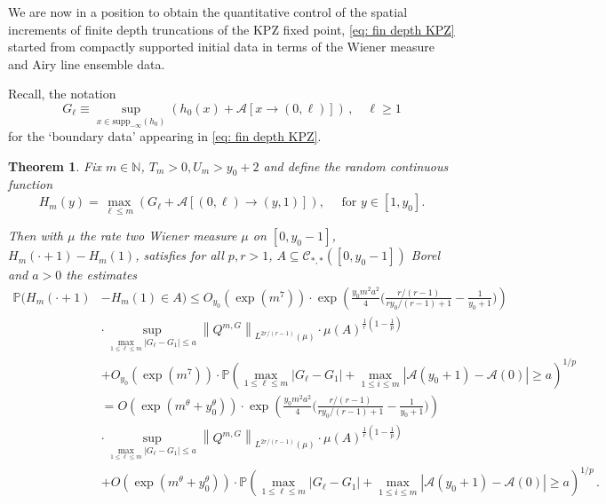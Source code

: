 \documentclass[11pt, reqno]{amsart}
\numberwithin{equation}{section}
\newcounter{dummy} \numberwithin{dummy}{section}
\newtheorem{theorem}[dummy]{Theorem}
\newcommand{\N}{\ensuremath{\mathbb{N}}}
\newcommand{\PP}{\ensuremath{\mathbb{P}}}
\newcommand{\norm}[1]{\left\lVert#1\right\rVert}
\begin{document}
We are now in a position to obtain the quantitative control of the spatial increments of finite depth truncations of the KPZ fixed point, \eqref{eq: fin depth KPZ} started from compactly supported initial data in terms of the Wiener measure and Airy line ensemble data.

Recall, the notation
\begin{equation*}
    G_\ell \equiv \sup_{ x\in \mathrm{supp}_{-\infty}(h_0)}(h_0(x)+\mathcal{A}[x\to(0,\ell)])\,,\quad \ell \ge 1
    \end{equation*}
    for the `boundary data' appearing in \eqref{eq: fin depth KPZ}.
\begin{theorem}\label{thm: finite depth KPZ estimates a priori}
 Fix $m\in \N$, $T_m>0 , U_m>y_0+2$ and define the random continuous function
\begin{equation*}
    H_m(y) = \displaystyle\max_{\ell \le m}(G_\ell + \mathcal{A}[(0,\ell)\to (y,1)]), \quad \text{ for } y\in [1,y_0].
\end{equation*}

Then with $\mu$ the rate two Wiener measure $\mu$ on $[0,y_0-1]$, $H_m(\cdot+1)-H_m(1)$, satisfies for all $p, r> 1$, $A\subseteq \mathscr{C}_{*, *}([0,y_0-1])$ Borel and $a> 0$ the estimates
\begin{align*}
    \PP ( H_m(\cdot + 1)&-H_m(1)\in A ) \le O_{y_0}(\exp(m^7))\cdot\exp\left({\frac{y_0m^2 a^2}{4}\big(\frac{r/(r-1)}{ry_0/(r-1)+1}-\frac{1}{y_0+1}\big)}\right)\\
        & \cdot \displaystyle\sup_{\max_{1\le \ell \le m}|G_\ell - G_1| \le a}\norm{Q^{m, G}}_{L^{2r/(r-1)}(\mu)} \cdot \mu(A)^{\frac{1}{r}(1-\frac{1}{p})}\\
        & + O_{y_0}(\exp(m^7))\cdot \mathbb{P}\left(\displaystyle \max_{1\le \ell \le m}|G_\ell - G_1| + \max_{1\le i \le m}|\mathcal{A}(y_0+1)-\mathcal{A}(0)|\ge a\right)^{1/p}\\
        & = O(\exp(m^\theta + y_0^\theta))\cdot\exp\left({\frac{y_0m^2 a^2}{4}\big(\frac{r/(r-1)}{ry_0/(r-1)+1}-\frac{1}{y_0+1}\big)}\right)\\
        & \cdot \displaystyle\sup_{\max_{1\le \ell \le m}|G_\ell - G_1| \le a}\norm{Q^{m, G}}_{L^{2r/(r-1)}(\mu)} \cdot \mu(A)^{\frac{1}{r}(1-\frac{1}{p})}\\
        & + O(\exp(m^\theta + y_0^\theta))\cdot \mathbb{P}\left(\displaystyle \max_{1\le \ell \le m}|G_\ell - G_1| + \max_{1\le i \le m}|\mathcal{A}(y_0+1)-\mathcal{A}(0)|\ge a\right)^{1/p} \,.
\end{align*}


\end{theorem}
\end{document}
